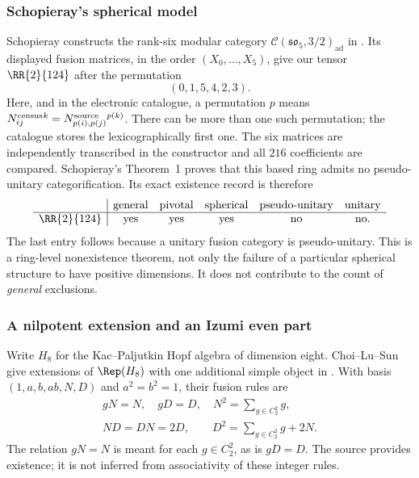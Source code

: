\subsubsection{Schopieray's spherical model}
Schopieray constructs the rank-six modular category
$\mathcal C(\mathfrak{so}_5,3/2)_{\mathrm{ad}}$ in
\cite[Example~1, equations~(1)--(2)]{SchNonPU}. Its displayed fusion
matrices, in the order $(X_0,\ldots,X_5)$, give our tensor $\RR{2}{124}$
after the permutation
\[
 (0,1,5,4,2,3).
\]
Here, and in the electronic catalogue, a permutation $p$ means
$N^{\rm census}_{ij}{}^k=N^{\rm source}_{p(i),p(j)}{}^{p(k)}$.
There can be more than one such permutation; the catalogue stores the
lexicographically first one. The six matrices are independently
transcribed in the constructor and all $216$ coefficients are compared.
Schopieray's Theorem~1 proves that this based ring admits no
pseudo-unitary categorification. Its exact existence record is therefore
\[
\begin{array}{c|ccccc}
 &\text{general}&\text{pivotal}&\text{spherical}&\text{pseudo-unitary}&\text{unitary}\\\hline
\RR{2}{124}&\text{yes}&\text{yes}&\text{yes}&\text{no}&\text{no}.
\end{array}
\]
The last entry follows because a unitary fusion category is
pseudo-unitary. This is a ring-level nonexistence theorem, not only the
failure of a particular spherical structure to have positive dimensions.
It does not contribute to the count of \emph{general} exclusions.

\subsubsection{A nilpotent extension and an Izumi even part}
Write $H_8$ for the Kac--Paljutkin Hopf algebra of dimension eight.
Choi--Lu--Sun give extensions of $\Rep(H_8)$ with one additional simple
object in \cite[equation~(1.4), Section~7.1 and Tables~3--4]{CLS}.
With basis $(1,a,b,ab,N,D)$ and $a^2=b^2=1$, their fusion rules are
\begin{equation}\label{eq:h8-extension}
 \begin{gathered}
 gN=N,\quad gD=D,\quad N^2=\sum_{g\in C_2^2}g,\\
 ND=DN=2D,\qquad D^2=\sum_{g\in C_2^2}g+2N.
 \end{gathered}
\end{equation}
The relation $gN=N$ is meant for each $g\in C_2^2$, as is $gD=D$.
The source provides existence; it is not inferred from associativity of
these integer rules.

